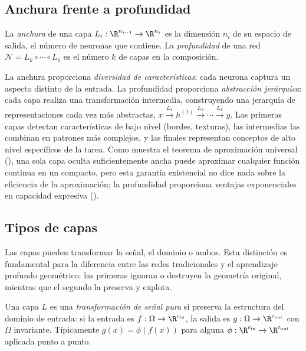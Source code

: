 \subsection{Anchura frente a profundidad}
\label{sec:found:width-depth}

\begin{definition}
\label{def:found:width-depth}
La \emph{anchura} de una capa $L_i : \R^{n_{i-1}} \to \R^{n_i}$ es la dimensi\'on
$n_i$ de su espacio de salida, el n\'umero de neuronas que contiene. La
\emph{profundidad} de una red $\mathcal{N} = L_k \circ \cdots \circ L_1$ es el
n\'umero $k$ de capas en la composici\'on.
\end{definition}

La anchura proporciona \emph{diversidad de caracter\'isticas}: cada neurona captura
un aspecto distinto de la entrada. La profundidad proporciona \emph{abstracci\'on
jer\'arquica}: cada capa realiza una transformaci\'on intermedia, construyendo una
jerarqu\'ia de representaciones cada vez m\'as abstractas, $x \xrightarrow{L_1}
h^{(1)} \xrightarrow{L_2} \cdots \xrightarrow{L_k} y$. Las primeras capas detectan
caracter\'isticas de bajo nivel (bordes, texturas), las intermedias las combinan en
patrones m\'as complejos, y las finales representan conceptos de alto nivel
espec\'ificos de la tarea. Como muestra el teorema de aproximaci\'on universal
(), una sola capa oculta suficientemente ancha puede
aproximar cualquier funci\'on continua en un compacto, pero esta garant\'ia
existencial no dice nada sobre la eficiencia de la aproximaci\'on; la profundidad
proporciona ventajas exponenciales en capacidad expresiva ().

\subsection{Tipos de capas}
\label{sec:found:layer-types}

Las capas pueden transformar la se\~nal, el dominio o ambos. Esta distinci\'on es
fundamental para la diferencia entre las redes tradicionales y el aprendizaje
profundo geom\'etrico: las primeras ignoran o destruyen la geometr\'ia original,
mientras que el segundo la preserva y explota.

\begin{definition}
\label{def:found:signal-transform}
Una capa $L$ es una \emph{transformaci\'on de se\~nal pura} si preserva la
estructura del dominio de entrada: si la entrada es $f : \Omega \to
\R^{c_{\mathrm{in}}}$, la salida es $g : \Omega \to \R^{c_{\mathrm{out}}}$ con
$\Omega$ invariante. T\'ipicamente $g(x) = \phi(f(x))$ para alguna
$\phi : \R^{c_{\mathrm{in}}} \to \R^{c_{\mathrm{out}}}$ aplicada punto a punto.
\end{definition}

